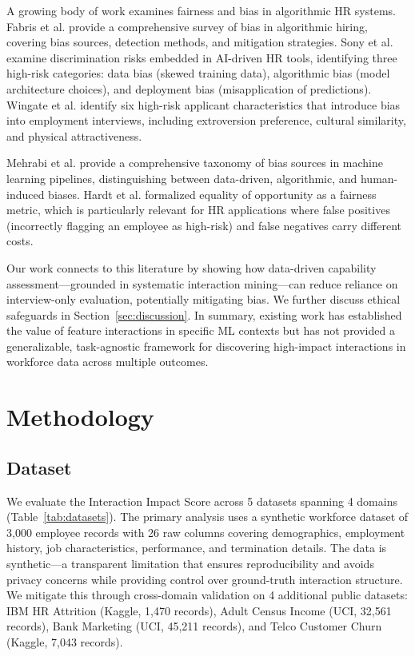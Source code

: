 \documentclass[conference]{IEEEtran}
\newcounter{algorithm}
\begin{document}
A growing body of work examines fairness and bias in algorithmic HR systems. Fabris et al. \cite{fabris2025fairness} provide a comprehensive survey of bias in algorithmic hiring, covering bias sources, detection methods, and mitigation strategies. Sony et al. \cite{sony2025bias} examine discrimination risks embedded in AI-driven HR tools, identifying three high-risk categories: data bias (skewed training data), algorithmic bias (model architecture choices), and deployment bias (misapplication of predictions). Wingate et al. \cite{wingate2024bias} identify six high-risk applicant characteristics that introduce bias into employment interviews, including extroversion preference, cultural similarity, and physical attractiveness.

Mehrabi et al. \cite{mehrabi2021survey} provide a comprehensive taxonomy of bias sources in machine learning pipelines, distinguishing between data-driven, algorithmic, and human-induced biases. Hardt et al. \cite{hardt2016equality} formalized equality of opportunity as a fairness metric, which is particularly relevant for HR applications where false positives (incorrectly flagging an employee as high-risk) and false negatives carry different costs.

Our work connects to this literature by showing how data-driven capability assessment---grounded in systematic interaction mining---can reduce reliance on interview-only evaluation, potentially mitigating bias. We further discuss ethical safeguards in Section~\ref{sec:discussion}. In summary, existing work has established the value of feature interactions in specific ML contexts but has not provided a generalizable, task-agnostic framework for discovering high-impact interactions in workforce data across multiple outcomes.

\section{Methodology}
\label{sec:methodology}

\subsection{Dataset}

We evaluate the Interaction Impact Score across 5 datasets spanning 4 domains (Table~\ref{tab:datasets}). The primary analysis uses a synthetic workforce dataset of 3,000 employee records with 26 raw columns covering demographics, employment history, job characteristics, performance, and termination details. The data is synthetic---a transparent limitation that ensures reproducibility and avoids privacy concerns while providing control over ground-truth interaction structure. We mitigate this through cross-domain validation on 4 additional public datasets: IBM HR Attrition (Kaggle, 1,470 records), Adult Census Income (UCI, 32,561 records), Bank Marketing (UCI, 45,211 records), and Telco Customer Churn (Kaggle, 7,043 records).
\end{document}
